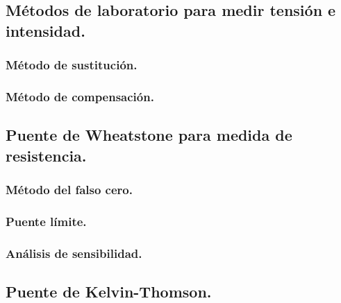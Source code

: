 \subsection{Métodos de laboratorio para medir tensión e intensidad.}
\subsubsection{Método de sustitución.}
\subsubsection{Método de compensación.}

\subsection{Puente de Wheatstone para medida de resistencia.}
\subsubsection{Método del falso cero.}
\subsubsection{Puente límite.}
\subsubsection{Análisis de sensibilidad.}
\subsection{Puente de Kelvin-Thomson.}